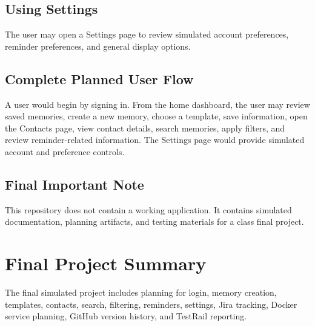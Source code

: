 \documentclass{article}
\begin{document}
\subsection{Using Settings}

The user may open a Settings page to review simulated account preferences, reminder preferences, and general display options.

\subsection{Complete Planned User Flow}

A user would begin by signing in. From the home dashboard, the user may review saved memories, create a new memory, choose a template, save information, open the Contacts page, view contact details, search memories, apply filters, and review reminder-related information. The Settings page would provide simulated account and preference controls.

\subsection{Final Important Note}

This repository does not contain a working application. It contains simulated documentation, planning artifacts, and testing materials for a class final project.

\section{Final Project Summary}

The final simulated project includes planning for login, memory creation, templates, contacts, search, filtering, reminders, settings, Jira tracking, Docker service planning, GitHub version history, and TestRail reporting.
\end{document}
